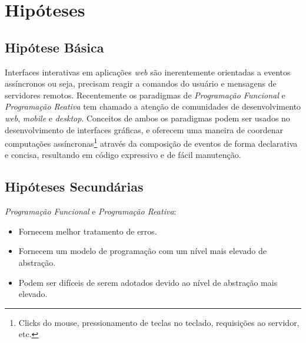 \section{Hipóteses}\label{lhipoteses}


\subsection{Hipótese Básica}

Interfaces interativas em aplicações \textit{web}
são inerentemente orientadas a eventos assíncronos
ou seja, precisam reagir a comandos do usuário e
mensagens de servidores remotos.
Recentemente os paradigmas de \textit{Programação Funcional}
e \textit{Programação Reativa} tem chamado a atenção de
comunidades de desenvolvimento \textit{web}, \textit{mobile}
e \textit{desktop}.
Conceitos de ambos os paradigmas podem ser usados
no desenvolvimento de interfaces gráficas,
e oferecem uma maneira de coordenar
computações assíncronas\footnote{
  Clicks do mouse, pressionamento de teclas no teclado,
  requisições ao servidor, etc.
}
através da composição de eventos de forma declarativa
e concisa, resultando em código expressivo e de fácil
manutenção.


\subsection{Hipóteses Secundárias}

\textit{Programação Funcional} e \textit{Programação Reativa}:
\begin{itemize}[noitemsep]
  \item Fornecem melhor tratamento de erros.
  \item Fornecem um modelo de programação com um nível mais elevado
        de abstração.
  \item Podem ser difíceis de serem adotados devido ao nível de abstração
        mais elevado.
\end{itemize}

